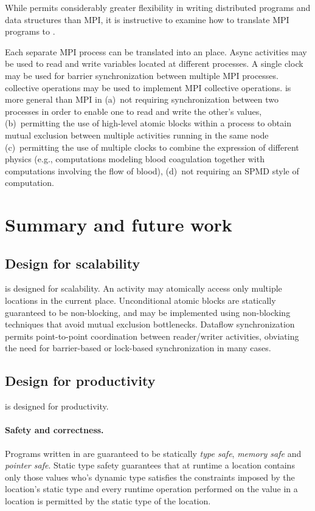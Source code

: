 While \Xten{} permits considerably greater flexibility in writing
distributed programs and data structures than MPI, it is instructive
to examine how to translate MPI programs to \Xten.

Each separate MPI process can be translated into an \Xten{}
place. Async activities may be used to read and write variables
located at different processes. A single clock may be used for barrier
synchronization between multiple MPI processes. \Xten{} collective
operations may be used to implement MPI collective operations.
\Xten{} is more general than MPI in (a)~not requiring synchronization
between two processes in order to enable one to read and write the
other's values, (b)~permitting the use of high-level atomic blocks
within a process to obtain mutual exclusion between multiple
activities running in the same node (c)~permitting the use of multiple
clocks to combine the expression of different physics (e.g.,
computations modeling blood coagulation together with computations
involving the flow of blood), (d)~not requiring an SPMD style of
computation.


\section{Summary and future work}
\subsection{Design for scalability}
\Xten{} is designed for scalability. An activity may atomically
access only multiple locations in the current place. Unconditional
atomic blocks are statically guaranteed to be non-blocking, and may
be implemented using non-blocking techniques that avoid mutual
exclusion bottlenecks. Dataflow synchronization permits point-to-point
coordination between reader/writer activities, obviating the need for
barrier-based or lock-based synchronization in many cases.

\subsection{Design for productivity}
\Xten{} is designed for productivity. 

\paragraph{Safety and correctness.} 
Programs written in \Xten{} are guaranteed to be statically
\emph{type
safe}, \emph{memory safe} and \emph{pointer safe}. Static type safety
guarantees that at runtime a location contains only those values who's
dynamic type satisfies the constraints imposed by the location's
static type and every runtime operation performed on the value in a
location is permitted by the static type of the location.

